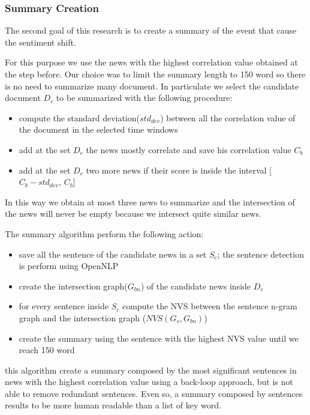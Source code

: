 \subsubsection*{Summary Creation}
The second goal of this research is to create a summary of the event that cause the sentiment shift. 

For this purpose we use the news with the highest correlation value obtained at the step before.
Our choice was to limit the summary length to 150 word so there is no need to summarize many document. 
In particulate we select the candidate document $D_c$ to be summarized with the following procedure:
\begin{itemize}
	\item compute the standard deviation($std_{dev}$) between all the correlation value of the document in the selected time windows
	\item add at the set $D_c$ the news mostly correlate and save his correlation value $C_b$
	\item add at the set $D_c$ two more news if their score is inside the interval [$C_b - std_{dev}$, $C_b$]
\end{itemize}
In this way we obtain at most three news to summarize and the intersection of the news will never be empty because we intersect quite similar news.

The summary algorithm perform the following action:
\begin{itemize}
	\item save all the sentence of the candidate news in a set $S_c$; the sentence detection is perform using OpenNLP
	\item create the intersection graph($G_{bn}$) of the candidate news inside $D_c$
	\item for every sentence inside $S_c$ compute the NVS between the sentence n-gram graph and the intersection graph ($NVS( G_{s}, G_{bn} )$)
	\item create the summary using the sentence with the highest NVS value until we reach 150 word
\end{itemize}
this algorithm create a summary composed by the most significant sentences in news with the highest correlation value using a back-loop approach, but is not able to remove redundant sentences. Even so, a summary composed by sentences results to be more human readable than a list of key word.
